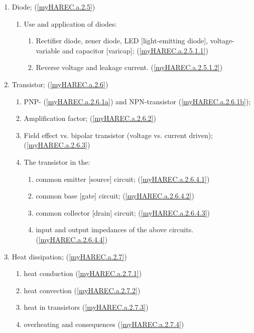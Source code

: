 \begin{enumerate}
\begin{enumerate}
\item Diode; (\ref{myHAREC.a.2.5})\label{HAREC.a.2.5}
\begin{enumerate}
\item Use and application of diodes:
\begin{enumerate}
\item Rectifier diode, zener diode, LED [light-emitting diode],
  voltage-variable and capacitor [varicap];
  (\ref{myHAREC.a.2.5.1.1})\label{HAREC.a.2.5.1.1}
\item Reverse voltage and leakage current.
  (\ref{myHAREC.a.2.5.1.2})\label{HAREC.a.2.5.1.2}
\end{enumerate}
\end{enumerate}

\item Transistor; (\ref{myHAREC.a.2.6})\label{HAREC.a.2.6}
\begin{enumerate}
\item PNP- (\ref{myHAREC.a.2.6.1a})\label{HAREC.a.2.6.1a}
  and NPN-transistor (\ref{myHAREC.a.2.6.1b})\label{HAREC.a.2.6.1b};
\item Amplification factor; (\ref{myHAREC.a.2.6.2})\label{HAREC.a.2.6.2}
\item Field effect vs. bipolar transistor (voltage vs. current driven);
  (\ref{myHAREC.a.2.6.3})\label{HAREC.a.2.6.3}
\item The transistor in the:
\begin{enumerate}
\item common emitter [source] circuit;
  (\ref{myHAREC.a.2.6.4.1})\label{HAREC.a.2.6.4.1}
\item common base [gate] circuit;
  (\ref{myHAREC.a.2.6.4.2})\label{HAREC.a.2.6.4.2}
\item common collector [drain] circuit;
  (\ref{myHAREC.a.2.6.4.3})\label{HAREC.a.2.6.4.3}
\item input and output impedances of the above circuits.
  (\ref{myHAREC.a.2.6.4.4})\label{HAREC.a.2.6.4.4}
\end{enumerate}
\end{enumerate}

\item Heat dissipation; (\ref{myHAREC.a.2.7})\label{HAREC.a.2.7}
\begin{enumerate}
\item heat conduction (\ref{myHAREC.a.2.7.1})\label{HAREC.a.2.7.1}
\item heat convection (\ref{myHAREC.a.2.7.2})\label{HAREC.a.2.7.2}
\item heat in transistors (\ref{myHAREC.a.2.7.3})\label{HAREC.a.2.7.3}
\item overheating and consequences (\ref{myHAREC.a.2.7.4})\label{HAREC.a.2.7.4}
\end{enumerate}


\end{enumerate}
\end{enumerate}
